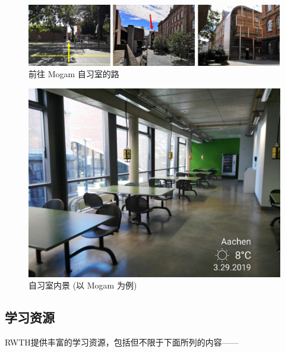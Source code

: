     \begin{figure}[H]
      \centering
      \includegraphics[width=\textwidth]{在亚琛学习和生活/Study/Mogam.png}
      \caption{前往 Mogam 自习室的路}
      \label{fig:Mogam}
    \end{figure}

    \begin{figure}[H]
      \centering
      \includegraphics[width=.35\textwidth]{在亚琛学习和生活/Study/自习室内景 (以 Mogam 为例).jpg}
      \caption{自习室内景 (以 Mogam 为例)}
      \label{fig:自习室内景 (以 Mogam 为例)}
    \end{figure}

  \subsection{学习资源}\label{subsec:学习资源}

    RWTH提供丰富的学习资源，包括但不限于下面所列的内容——

